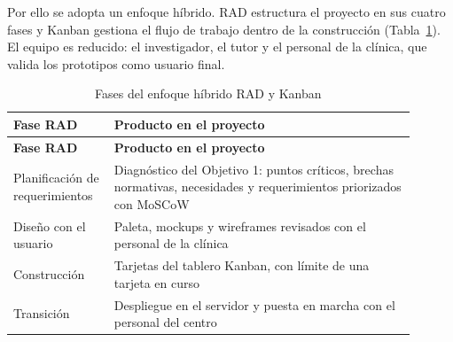 Por ello se adopta un enfoque híbrido. RAD estructura el proyecto en sus cuatro fases y Kanban gestiona el flujo de trabajo dentro de la construcción (Tabla~\ref{tab:ob2_fases_rad}). El equipo es reducido: el investigador, el tutor y el personal de la clínica, que valida los prototipos como usuario final.

\begingroup
\fontsize{9}{11}\selectfont
\renewcommand{\arraystretch}{1.2}
\setlength{\LTpre}{0pt}\setlength{\LTpost}{6pt}
\setlength{\tabcolsep}{4pt}
\begin{longtable}{|>{\raggedright\arraybackslash}p{0.22\linewidth}|>{\raggedright\arraybackslash}p{0.68\linewidth}|}
\caption{Fases del enfoque híbrido RAD y Kanban}
\label{tab:ob2_fases_rad} \\
\hline
\textbf{Fase RAD} & \textbf{Producto en el proyecto} \\ \hline
\endfirsthead
\hline
\textbf{Fase RAD} & \textbf{Producto en el proyecto} \\ \hline
\endhead
Planificación de requerimientos & Diagnóstico del Objetivo 1: puntos críticos, brechas normativas, necesidades y requerimientos priorizados con MoSCoW \\ \hline
Diseño con el usuario & Paleta, mockups y wireframes revisados con el personal de la clínica\\ \hline
Construcción & Tarjetas del tablero Kanban, con límite de una tarjeta en curso \\ \hline
Transición & Despliegue en el servidor y puesta en marcha con el personal del centro  \\ \hline
\end{longtable}
\endgroup
